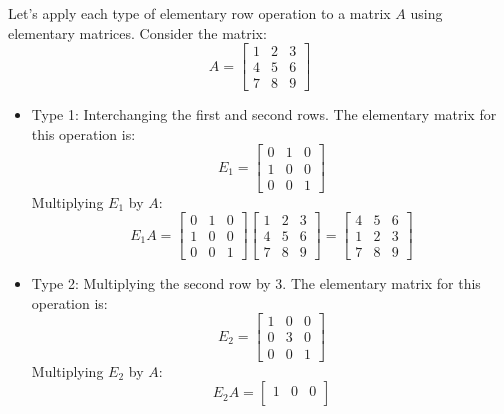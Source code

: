 \begin{eg}
    Let's apply each type of elementary row operation to a matrix \( A \) using elementary matrices. Consider the matrix:
    \[
        A = \begin{bmatrix}
            1 & 2 & 3 \\
            4 & 5 & 6 \\
            7 & 8 & 9
        \end{bmatrix}
    \]
    \begin{itemize}[itemsep=1pt,label=$\circ$]
        \item Type 1: Interchanging the first and second rows. The elementary matrix for this operation is:
        \[
            E_1 = \begin{bmatrix}
                0 & 1 & 0 \\
                1 & 0 & 0 \\
                0 & 0 & 1
            \end{bmatrix}
        \]
        Multiplying \( E_1 \) by \( A \):
        \[
            E_1 A = \begin{bmatrix}
                0 & 1 & 0 \\
                1 & 0 & 0 \\
                0 & 0 & 1
            \end{bmatrix} \begin{bmatrix}
                1 & 2 & 3 \\
                4 & 5 & 6 \\
                7 & 8 & 9
            \end{bmatrix} = \begin{bmatrix}
                4 & 5 & 6 \\
                1 & 2 & 3 \\
                7 & 8 & 9
            \end{bmatrix}
        \]
        \item Type 2: Multiplying the second row by 3. The elementary matrix for this operation is:
        \[
            E_2 = \begin{bmatrix}
                1 & 0 & 0 \\
                0 & 3 & 0 \\
                0 & 0 & 1
            \end{bmatrix}
        \]
        Multiplying \( E_2 \) by \( A \):
        \[
            E_2 A = \begin{bmatrix}
                1 & 0 & 0 \\

\end{bmatrix}\]
\end{itemize}
\end{eg}
